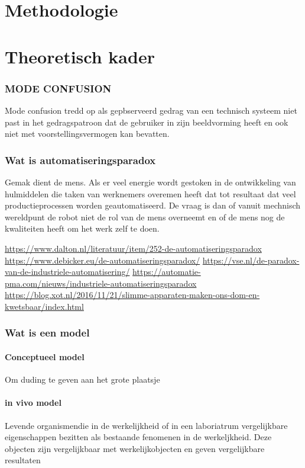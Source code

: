 \graphicspath{{2_Body/Figures/}}




\chapter{Methodologie}
\label{chapter:body}
\thispagestyle{myheadings}




\chapter{Theoretisch kader}
\subsection{MODE CONFUSION }
Mode confusion tredd op als gepbserveerd gedrag van een technisch systeem niet past in het gedragspatroon dat de gebruiker in zijn beeldvorming heeft  en ook niet met voorstellingsvermogen kan bevatten.
\subsection{Wat is automatiseringsparadox}
Gemak dient de mens. Als er veel energie wordt gestoken in de ontwikkeling van hulmiddelen die taken van werknemers overemen heeft dat tot resultaat dat veel productieprocessen worden geautomatiseerd. De vraag is dan of vanuit mechnisch wereldpunt de robot niet de rol van de mens overneemt en of de mens nog de kwaliteiten heeft om het werk zelf te doen.

\url{https://www.dalton.nl/literatuur/item/252-de-automatiseringsparadox}
\url{https://www.debicker.eu/de-automatiseringsparadox/}
\url{https://vse.nl/de-paradox-van-de-industriele-automatisering/}
\url{https://automatie-pma.com/nieuws/industriele-automatiseringsparadox}
\url{https://blog.xot.nl/2016/11/21/slimme-apparaten-maken-ons-dom-en-kwetsbaar/index.html}

\subsection{Wat is een model}
\subsubsection{Conceptueel model}
Om duding te geven aan het grote plaatsje
\subsubsection{in vivo model}
Levende organismendie in de werkelijkheid of in een laboriatrum vergelijkbare eigenschappen bezitten als bestaande fenomenen in de werkeljkheid. Deze objecten zijn vergelijkbaar met werkelijkobjecten en geven vergelijkbare resultaten
